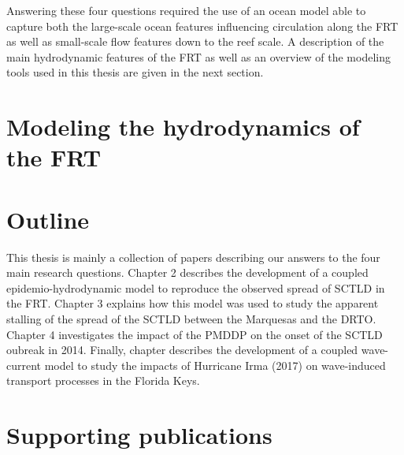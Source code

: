 Answering these four questions required the use of an ocean model able to capture both the large-scale ocean features influencing circulation along the FRT as well as small-scale flow features down to the reef scale. A description of the main hydrodynamic features of the FRT as well as an overview of the modeling tools used in this thesis are given in the next section.

\section*{Modeling the hydrodynamics of the FRT}

\section*{Outline}
This thesis is mainly a collection of papers describing our answers to the four main research questions. Chapter 2 describes the development of a coupled epidemio-hydrodynamic model to reproduce the observed spread of SCTLD in the FRT. Chapter 3 explains how this model was used to study the apparent stalling of the spread of the SCTLD between the Marquesas and the DRTO. Chapter 4 investigates the impact of the PMDDP on the onset of the SCTLD oubreak in 2014. Finally, chapter describes the development of a coupled wave-current model to study the impacts of Hurricane Irma (2017) on wave-induced transport processes in the Florida Keys. 

\section*{Supporting publications}

